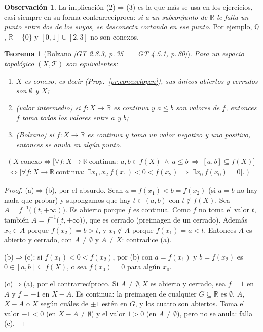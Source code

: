 \documentclass[11pt,a4paper]{article}
\newcommand{\lgc}[1]{\par\vspace{-3pt}\begin{gather*}\big(\;#1\;\big)\end{gather*}\vspace{-6pt}}
\theoremstyle{definition}
\newtheorem{observacion}[definicion]{Observación}
\theoremstyle{plain}
\newtheorem{teorema}[definicion]{Teorema}
\newcommand{\fnt}[1]{{\normalfont\small\itshape\color{gray!150!black}[#1]}}
\newcommand{\R}{\mathbb{R}}
\newcommand{\Q}{\mathbb{Q}}
\newcommand{\tp}{\mathcal{T}}
\begin{document}
\begin{observacion}
La implicación (2)$\Rightarrow$(3) es la que más se usa en los ejercicios, casi siempre en su forma contrarrecíproca: \emph{si a un subconjunto de $\R$ le falta un punto entre dos de los suyos, se desconecta cortando en ese punto}. Por ejemplo, $\Q$, $\R-\{0\}$ y $[0,1]\cup[2,3]$ no son conexos.
\end{observacion}

\begin{teorema}[Bolzano \fnt{GT 2.8.3, p.\,35 $=$ GT 4.5.1, p.\,80}]\label{hu:bolzano}
Para un espacio topológico $(X,\tp)$ son equivalentes:
\begin{enumerate}[label=(\alph*),leftmargin=2.2em,itemsep=0pt]
\item $X$ es conexo, es decir (Prop.~\ref{pr:conexclopen}), sus únicos abiertos y cerrados son $\emptyset$ y $X$;
\item (valor intermedio) si $f:X\to\R$ es continua y $a\le b$ son valores de $f$, entonces $f$ toma todos los valores entre $a$ y $b$;
\item (Bolzano) si $f:X\to\R$ es continua y toma un valor negativo y uno positivo, entonces se anula en algún punto.
\end{enumerate}
\lgc{X\ \text{conexo}\iff \big[\forall f:X\to\R\ \text{continua}:\ a,b\in f(X)\ \wedge\ a\le b\ \Rightarrow\ [a,b]\subseteq f(X)\big]\\
\iff \big[\forall f:X\to\R\ \text{continua}:\ \exists x_1,x_2\ f(x_1)<0<f(x_2)\ \Rightarrow\ \exists x_0\ f(x_0)=0\big].}
\end{teorema}

\begin{proof}
(a)$\Rightarrow$(b), por el absurdo. Sean $a=f(x_1)<b=f(x_2)$ (si $a=b$ no hay nada que probar) y supongamos que hay $t\in(a,b)$ con $t\notin f(X)$. Sea $A=f^{-1}\big((t,+\infty)\big)$. Es abierto porque $f$ es continua. Como $f$ no toma el valor $t$, también $A=f^{-1}\big([t,+\infty)\big)$, que es cerrado (preimagen de un cerrado). Además $x_2\in A$ porque $f(x_2)=b>t$, y $x_1\notin A$ porque $f(x_1)=a<t$. Entonces $A$ es abierto y cerrado, con $A\ne\emptyset$ y $A\ne X$: contradice (a).

(b)$\Rightarrow$(c): si $f(x_1)<0<f(x_2)$, por (b) con $a=f(x_1)$ y $b=f(x_2)$ es $0\in[a,b]\subseteq f(X)$, o sea $f(x_0)=0$ para algún $x_0$.

(c)$\Rightarrow$(a), por el contrarrecíproco. Si $A\ne\emptyset,X$ es abierto y cerrado, sea $f=1$ en $A$ y $f=-1$ en $X-A$. Es continua: la preimagen de cualquier $G\subseteq\R$ es $\emptyset$, $A$, $X-A$ o $X$ según cuáles de $\pm1$ estén en $G$, y los cuatro son abiertos. Toma el valor $-1<0$ (en $X-A\ne\emptyset$) y el valor $1>0$ (en $A\ne\emptyset$), pero no se anula: falla (c).
\end{proof}
\end{document}
